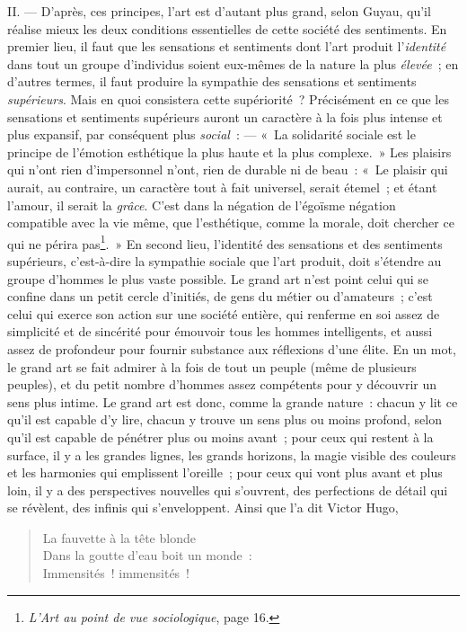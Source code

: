 \documentclass[french,twoside]{book} %
\begin{document}
II. — D’après, ces principes, l’art est d’autant plus grand, selon Guyau, qu’il réalise mieux les deux conditions essentielles de cette société des sentiments. En premier lieu, il faut que les sensations et sentiments dont l’art produit l’\emph{identité} dans tout un groupe d’individus soient eux-mêmes de la nature la plus \emph{élevée} ; en d’autres termes, il faut produire la sympathie des sensations et sentiments \emph{supérieurs}. Mais en quoi consistera cette supériorité ? Précisément en ce que les sensations et sentiments supérieurs auront un caractère à la fois plus intense et plus expansif, par conséquent plus \emph{social} : — « La solidarité sociale est le principe de l’émotion esthétique la plus haute et la plus complexe. » Les plaisirs qui n’ont rien d’impersonnel n’ont, rien de durable ni de beau : « Le plaisir qui aurait, au contraire, un caractère tout à fait universel, serait étemel ; et étant l’amour, il serait la \emph{grâce}. C’est dans la négation de l’égoïsme négation compatible avec la vie même, que l’esthétique, comme la morale, doit chercher ce qui ne périra pas\footnote{\emph{L’Art au point de vue sociologique}, page 16.}. » En second lieu, l’identité des sensations et des sentiments supérieurs, c’est-à-dire la sympathie sociale que l’art produit, doit s’étendre au groupe d’hommes le plus vaste possible. Le grand art n’est point celui qui se confine dans un petit cercle d’initiés, de gens du métier ou d’amateurs ; c’est celui qui exerce son action sur une société entière, qui renferme en soi assez de simplicité et de sincérité pour émouvoir tous les hommes intelligents, et aussi assez de profondeur pour fournir substance aux réflexions d’une élite. En un mot, le grand art se fait admirer à la fois de tout un peuple (même de plusieurs peuples), et du petit nombre d’hommes assez compétents pour y découvrir un sens plus intime. Le grand art est donc, comme la grande nature : chacun y lit ce qu’il est capable d’y lire, chacun y trouve un sens plus ou moins profond, selon qu’il est capable de pénétrer plus ou moins avant ; pour ceux qui restent à la surface, il y a les grandes lignes, les grands horizons, la magie visible des couleurs et les harmonies qui emplissent l’oreille ; pour ceux qui vont plus avant et plus loin, il y a des perspectives nouvelles qui s’ouvrent, des perfections de détail qui se révèlent, des infinis qui s’enveloppent. Ainsi que l’a dit Victor Hugo,\par


\begin{verse}
La fauvette à la tête blonde\\
Dans la goutte d’eau boit un monde :\\
Immensités ! immensités !\\
\end{verse}
\end{document}
